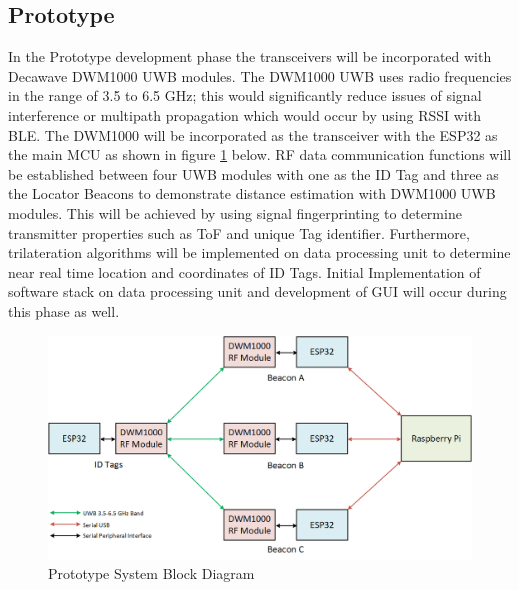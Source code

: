 \subsection{Prototype}
\medskip
In the Prototype development phase the transceivers will be incorporated with Decawave DWM1000 UWB modules. The DWM1000 UWB uses radio frequencies in the range of 3.5 to 6.5 GHz; this would significantly reduce issues of signal interference or multipath propagation which would occur by using RSSI with BLE. The DWM1000 will be incorporated as the transceiver with the ESP32 as the main MCU as shown in figure \ref{prototype} below. RF data communication functions will be established between four UWB modules with one as the ID Tag and three as the Locator Beacons to demonstrate distance estimation with DWM1000 UWB modules. This will be achieved by using signal fingerprinting to determine transmitter properties such as ToF and unique Tag identifier. Furthermore, trilateration algorithms will be implemented on data processing unit to determine near real time location and coordinates of ID Tags. Initial Implementation of software stack on data processing unit and development of GUI will occur during this phase as well.

\medskip
\begin{figure}[H]
\centering
    \includegraphics[width=\linewidth]{./images/02_prototype.png}
    \caption{Prototype System Block Diagram}
    \label{prototype}
\end{figure}


\pagebreak

